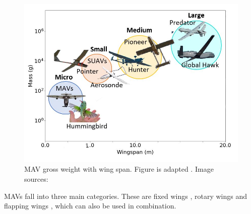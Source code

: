 \begin{figure}[H]
  \centering
   \includegraphics[width=\linewidth]{01_Introduction/Figs/replacement.JPG}
  \caption{MAV gross weight with wing span. Figure is adapted \cite{uavsize}. Image sources: \cite{MAVImage} \cite{Hummingbird} \cite{Ava} \cite{Aerosonde} \cite{hunter} \cite{pioneer} \cite{MQ9} \cite{hawk}}
  \label{fig:sizes}
\end{figure}


MAVs fall into three main categories. These are fixed wings \cite{Stanford2008}, rotary wings \cite{Lasek2001} and flapping wings \cite{Platzer2012}, which can also be used in combination.







